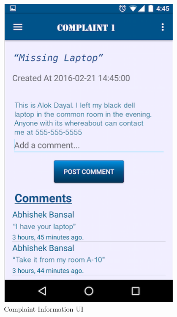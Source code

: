\documentclass{article}
\begin{document}
	    \begin{figure}[H]
      \centering
      \begin{subfigure}{.4\textwidth}
          \centering
          \includegraphics[width=0.9\linewidth]{insidecomplaint.png}
          \caption{Complaint Information UI}
          \label{fig:sub1}
      \end{subfigure}%
      \begin{subfigure}{.4\textwidth}
          \centering

\end{subfigure}
\end{figure}
\end{document}
